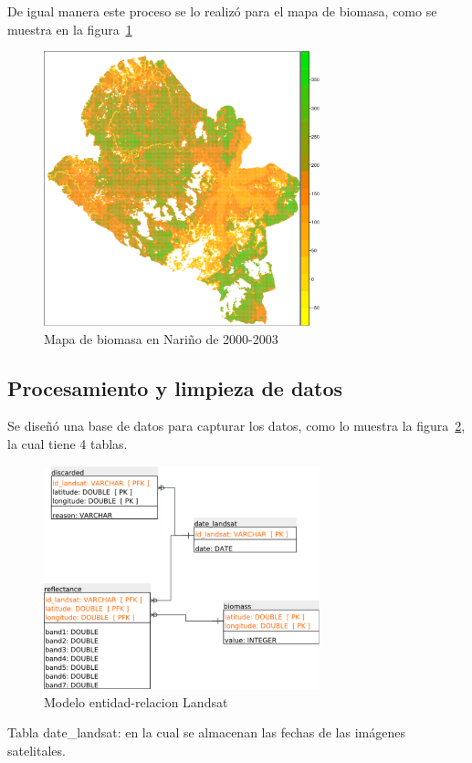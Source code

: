 De igual manera este proceso se lo realizó para el mapa de biomasa, como se muestra en la figura~\ref{fig:mapaNarino}

\begin{figure}
  \centering
  \includegraphics[width = 8cm]{mapaNarino.pdf}
  \caption{Mapa de biomasa en Nariño de 2000-2003 \cite{baccini2008afirst}}
  \label{fig:mapaNarino}
\end{figure}

\subsection{Procesamiento y limpieza de datos}

Se diseñó una base de datos para capturar los datos,
como lo muestra la figura~\ref{fig:landsatET}, la cual tiene 4 tablas. 

\begin{figure}
  \centering
  \includegraphics[width = 8cm]{landsatET.pdf}
  \caption{Modelo entidad-relacion Landsat}
  \label{fig:landsatET}
\end{figure}

Tabla date\_landsat: en la cual se almacenan las fechas de las imágenes satelitales.


